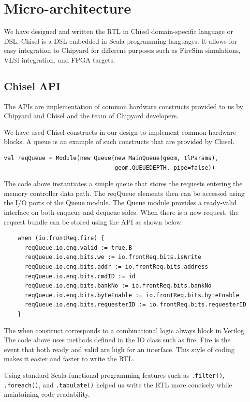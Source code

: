 \chapter{Micro-architecture}
We have designed and written the RTL in Chisel \cite{10.1145/2228360.2228584} domain-specific language or DSL. Chisel is a DSL embedded in Scala programming languages. It allows for easy integration to Chipyard for different purposes such as FireSim \cite{8416816} simulations, VLSI integration, and FPGA targets. 
\section{Chisel API}
The APIs are implementation of common hardware constructs provided to us by Chipyard \cite{chipyard} and Chisel \cite{Asanović:EECS-2016-17} and the team of Chipyard developers.

We have used Chisel constructs in our design to implement common hardware blocks. A queue is an example of such constructs that are provided by Chisel. 
\begin{verbatim}
val reqQueue = Module(new Queue(new MainQueue(geom, tlParams),
                                geom.QUEUEDEPTH, pipe=false))    
\end{verbatim}
The code above instantiates a simple queue that stores the requests entering the memory controller data path. The reqQueue elements then can be accessed using the I/O ports of the Queue module. The Queue module provides a ready-valid interface on both enqueue and dequeue sides. When there is a new request, the request bundle can be stored using the API as shown below:
\begin{verbatim}
    when (io.frontReq.fire) {
      reqQueue.io.enq.valid := true.B
      reqQueue.io.enq.bits.we := io.frontReq.bits.isWrite
      reqQueue.io.enq.bits.addr := io.frontReq.bits.address
      reqQueue.io.enq.bits.cmdID := id
      reqQueue.io.enq.bits.bankNo := io.frontReq.bits.bankNo
      reqQueue.io.enq.bits.byteEnable := io.frontReq.bits.byteEnable
      reqQueue.io.enq.bits.requesterID := io.frontReq.bits.requesterID
    }
\end{verbatim}

The when construct corresponds to a combinational logic always block in Verilog. The code above uses methods defined in the IO class such as fire. Fire is the event that both ready and valid are high for an interface. This style of coding makes it easier and faster to write the RTL. 

Using standard Scala functional programming features such as \verb|.filter()|, \verb|.foreach()|, and \verb|.tabulate()| helped us write the RTL more concisely while maintaining code readability. 


